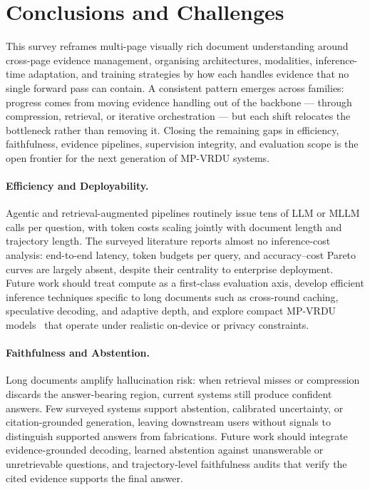 \documentclass[11pt]{article}
\begin{document}
\section{Conclusions and Challenges}
\label{sec:challenges}
This survey reframes multi-page visually rich document understanding around cross-page evidence management, organising architectures, modalities, inference-time adaptation, and training strategies by how each handles evidence that no single forward pass can contain. A consistent pattern emerges across families: progress comes from moving evidence handling out of the backbone — through compression, retrieval, or iterative orchestration — but each shift relocates the bottleneck rather than removing it. Closing the remaining gaps in efficiency, faithfulness, evidence pipelines, supervision integrity, and evaluation scope is the open frontier for the next generation of MP-VRDU systems.
\paragraph{Efficiency and Deployability.}
\label{sec:chal-eff}
Agentic and retrieval-augmented pipelines routinely issue tens of LLM or MLLM calls per question, with token costs scaling jointly with document length and trajectory length. The surveyed literature reports almost no inference-cost analysis: end-to-end latency, token budgets per query, and accuracy–cost Pareto curves are largely absent, despite their centrality to enterprise deployment. Future work should treat compute as a first-class evaluation axis, develop efficient inference techniques specific to long documents such as cross-round caching, speculative decoding, and adaptive depth, and explore compact MP-VRDU models~\cite{hannan2025docslm} that operate under realistic on-device or privacy constraints.

\paragraph{Faithfulness and Abstention.}
\label{sec:chal-faith}
Long documents amplify hallucination risk: when retrieval misses or compression discards the answer-bearing region, current systems still produce confident answers. Few surveyed systems support abstention, calibrated uncertainty, or citation-grounded generation, leaving downstream users without signals to distinguish supported answers from fabrications. Future work should integrate evidence-grounded decoding, learned abstention against unanswerable or unretrievable questions, and trajectory-level faithfulness audits that verify the cited evidence supports the final answer.
\end{document}
